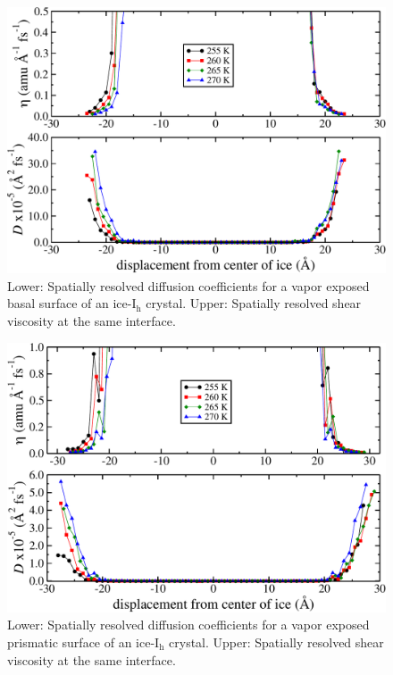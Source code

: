 \begin{figure}
\includegraphics[width=\linewidth]{Figures/basal_DEta}
\caption{\label{fig:basal_DEta} Lower: Spatially resolved diffusion
  coefficients for a vapor exposed basal surface of an
  ice-I$_\mathrm{h}$ crystal. Upper: Spatially resolved shear viscosity
  at the same interface.}
\end{figure}                

\begin{figure}
\includegraphics[width=\linewidth]{Figures/prism_DEta}
\caption{\label{fig:prism_DEta} Lower: Spatially resolved diffusion
  coefficients for a vapor exposed prismatic surface of an
  ice-I$_\mathrm{h}$ crystal. Upper: Spatially resolved shear viscosity
  at the same interface.}
\end{figure}                

